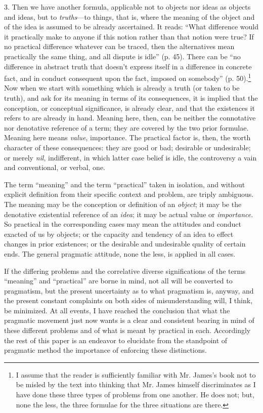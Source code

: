 \documentclass[12pt]{article}
\begin{document}
3. Then we have another formula, applicable not to objects nor ideas
as objects and ideas, but to \emph{truths}---to things, that is, where the
meaning of the object and of the idea is assumed to be already
ascertained. It reads: ``What difference would it practically make to
anyone if this notion rather than that notion were true? If no
practical difference whatever can be traced, then the alternatives
mean practically the same thing, and all dispute is idle'' (p. 45).
There can be ``no difference in abstract truth that
doesn't express itself in a difference in concrete fact, and in
conduct consequent upon the fact, imposed on somebody'' (p. 50).\footnote{I assume that the reader is sufficiently familiar with
Mr. James's book not to be misled by the text into thinking that Mr.
James himself discriminates as I have done these three types of
problems from one another. He does not; but, none the less, the three
formulae for the three situations are there.} Now
when we start with something which is already a truth (or taken to be
truth), and ask for its meaning in terms of its consequences, it is
implied that the conception, or conceptual significance, is already
clear, and that the existences it refers to are already in hand.
Meaning here, then, can be neither the connotative nor denotative
reference of a term; they are covered by the two prior formulae.
Meaning here means \emph{value}, importance. The practical factor is, then,
the worth character of these consequences: they are good or bad;
desirable or undesirable; or merely \emph{nil}, indifferent, in which
latter case belief is idle, the controversy a vain and conventional,
or verbal, one.


The term ``meaning'' and the term ``practical'' taken in isolation, and
without explicit definition from their specific context and problem,
are triply ambiguous. The meaning may be the conception or definition
of an \emph{object}; it may be the denotative existential reference of an
\emph{idea}; it may be actual value or \emph{importance}. So practical in the
corresponding cases may mean the attitudes and conduct exacted of us
by objects; or the capacity and tendency of an idea to
effect changes in prior existences; or the desirable and undesirable
quality of certain ends. The general pragmatic attitude, none the
less, is applied in all cases.


If the differing problems and the correlative diverse significations
of the terms ``meaning'' and ``practical'' are borne in mind, not all will
be converted to pragmatism, but the present uncertainty as to what
pragmatism is, anyway, and the present constant complaints on both
sides of misunderstanding will, I think, be minimized. At all events,
I have reached the conclusion that what the pragmatic movement just
now wants is a clear and consistent bearing in mind of these different
problems and of what is meant by practical in each. Accordingly the
rest of this paper is an endeavor to elucidate from the standpoint of
pragmatic method the importance of enforcing these distinctions.
\end{document}
